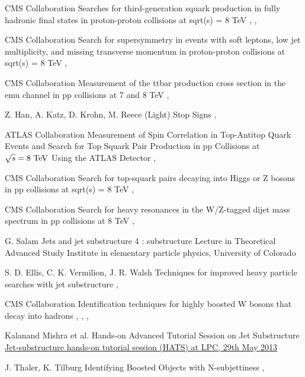 {CMS Collaboration}
{Searches for third-generation squark production in fully hadronic final states in proton-proton collisions at sqrt(s) = 8 TeV}
{, , }

{CMS Collaboration}
{Search for supersymmetry in events with soft leptons, low jet multiplicity, and missing transverse momentum in proton-proton collisions at sqrt(s) = 8 TeV}
{, }

{CMS Collaboration}
{Measurement of the ttbar production cross section in the emu channel in pp collisions at 7 and 8 TeV}
{, }

{Z. Han, A. Katz, D. Krohn, M. Reece}
{(Light) Stop Signs}
{, }

{ATLAS Collaboration}
{Measurement of Spin Correlation in Top-Antitop Quark Events and Search for Top Squark Pair Production in pp Collisions at $\sqrt{s}=8~\text{TeV}$ Using the ATLAS Detector}
{, }

{CMS Collaboration}
{Search for top-squark pairs decaying into Higgs or Z bosons in pp collisions at sqrt(s) = 8 TeV}
{, }


{CMS Collaboration}
{Search for heavy resonances in the W/Z-tagged dijet mass
spectrum in pp collisions at 8 TeV}
{, }

{G. Salam}
{Jets and jet substructure 4 : substructure}
{Lecture in Theoretical Advanced Study Institute in elementary particle physics,
University of Colorado}

{S. D. Ellis, C. K. Vermilion, J. R. Walsh}
{Techniques for improved heavy particle searches with jet substructure}
{, }

{CMS Collaboration}
{Identification techniques for highly boosted W bosons that decay into hadrons}
{, , , }

{Kalanand Mishra et al.}
{Hands-on Advanced Tutorial Session on Jet Substructure}
{\href{https://twiki.cern.ch/twiki/pub/CMSPublic/SWGuideHATSJetSubstructure/JS_HATS_intro.pdf}{Jet-substructure hands-on tutorial session (HATS) at LPC, 29th May 2013}}

{J. Thaler, K. Tilburg}
{Identifying Boosted Objects with N-subjettiness}
{, }



